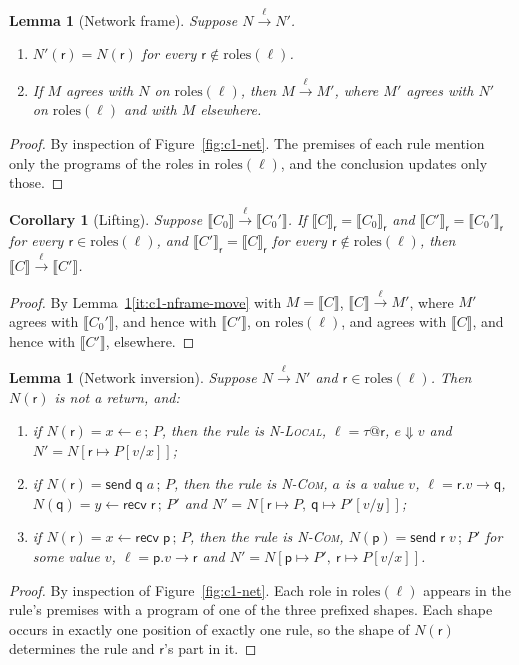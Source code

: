 \documentclass[11pt]{report}
\makeatletter
\theoremstyle{plain}
\newtheorem{lemma}[theorem]{Lemma}
\newtheorem{corollary}[theorem]{Corollary}
\theoremstyle{definition}
\theoremstyle{remark}
\newcommand{\kw}[1]{\mathsf{#1}}
\newcommand{\pp}{\mathsf{p}}
\newcommand{\qq}{\mathsf{q}}
\newcommand{\rr}{\mathsf{r}}
\newcommand{\com}[3]{#1.#2 \to #3}
\newcommand{\roles}[1]{\mathrm{roles}(#1)}
\newcommand{\tauat}[1]{\tau\mathord{@}#1}
\newcommand{\lto}[1]{\xrightarrow{\;#1\;}}
\newcommand{\nsend}[2]{\kw{send}\;#1\;#2}
\newcommand{\nrecv}[1]{\kw{recv}\;#1}
\newcommand{\upd}[3]{#1[#2 \mapsto #3]}
\newcommand{\proj}[2]{\llbracket #1 \rrbracket_{#2}}
\newcommand{\projn}[1]{\llbracket #1 \rrbracket}
\newcommand{\rn}[1]{{\normalfont\scshape #1}}
\makeatother
\begin{document}
\begin{lemma}[Network frame]\label{lem:c1-nframe}
  Suppose $N\lto{\ell}N'$.
  \begin{enumerate}[label=(\roman*),nosep]
  \item\label{it:c1-nframe-loc} $N'(\rr)=N(\rr)$ for every $\rr\notin\roles{\ell}$.
  \item\label{it:c1-nframe-move} If $M$ agrees with $N$ on $\roles{\ell}$, then
    $M\lto{\ell}M'$, where $M'$ agrees with $N'$ on $\roles{\ell}$ and with
    $M$ elsewhere.
  \end{enumerate}
\end{lemma}
\begin{proof}
  By inspection of Figure~\ref{fig:c1-net}.  The premises of each rule
  mention only the programs of the roles in $\roles{\ell}$, and the
  conclusion updates only those.
\end{proof}

\begin{corollary}[Lifting]\label{cor:c1-lift}
  Suppose $\projn{C_0}\lto{\ell}\projn{C_0'}$.  If
  $\proj{C}{\rr}=\proj{C_0}{\rr}$ and $\proj{C'}{\rr}=\proj{C_0'}{\rr}$ for
  every $\rr\in\roles{\ell}$, and $\proj{C'}{\rr}=\proj{C}{\rr}$ for every
  $\rr\notin\roles{\ell}$, then $\projn{C}\lto{\ell}\projn{C'}$.
\end{corollary}
\begin{proof}
  By Lemma~\ref{lem:c1-nframe}\ref{it:c1-nframe-move} with $M=\projn{C}$,
  $\projn{C}\lto{\ell}M'$, where $M'$ agrees with $\projn{C_0'}$, and hence
  with $\projn{C'}$, on $\roles{\ell}$, and agrees with $\projn{C}$, and
  hence with $\projn{C'}$, elsewhere.
\end{proof}

\begin{lemma}[Network inversion]\label{lem:c1-inv}
  Suppose $N\lto{\ell}N'$ and $\rr\in\roles{\ell}$.  Then $N(\rr)$ is not a
  return, and:
  \begin{enumerate}[label=(\alph*),nosep]
  \item\label{it:c1-inv-local} if $N(\rr)=x\leftarrow e\,;\,P$, then the rule
    is \rn{N-Local}, $\ell=\tauat{\rr}$, $e\Downarrow v$ and $N'=\upd{N}{\rr}{P[v/x]}$;
  \item\label{it:c1-inv-send} if $N(\rr)=\nsend{\qq}{a}\,;\,P$, then the rule
    is \rn{N-Com}, $a$ is a value $v$, $\ell=\com{\rr}{v}{\qq}$,
    $N(\qq)=y\leftarrow\nrecv{\rr}\,;\,P'$ and
    $N'=N[\rr\mapsto P,\ \qq\mapsto P'[v/y]]$;
  \item\label{it:c1-inv-recv} if $N(\rr)=x\leftarrow\nrecv{\pp}\,;\,P$, then the
    rule is \rn{N-Com}, $N(\pp)=\nsend{\rr}{v}\,;\,P'$ for some value $v$,
    $\ell=\com{\pp}{v}{\rr}$ and $N'=N[\pp\mapsto P',\ \rr\mapsto P[v/x]]$.
  \end{enumerate}
\end{lemma}
\begin{proof}
  By inspection of Figure~\ref{fig:c1-net}.  Each role in $\roles{\ell}$
  appears in the rule's premises with a program of one of the three prefixed
  shapes.  Each shape occurs in exactly one position of exactly one rule, so
  the shape of $N(\rr)$ determines the rule and $\rr$'s part in it.
\end{proof}
\end{document}
